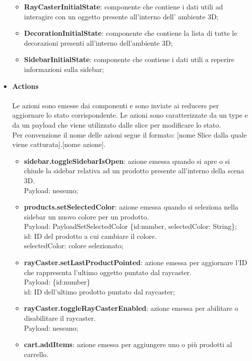 \begin{itemize}
\begin{itemize}
			\item \textbf{RayCasterInitialState}: componente che contiene i dati utili ad interagire con un oggetto presente all'interno dell'
			ambiente 3D;
			\item \textbf{DecorationInitialState}: componente che contiene la lista di tutte le decorazioni presenti all'interno dell'ambiente 3D;
			\item \textbf{SidebarInitialState}: componente che contiene i dati utili a reperire informazioni sulla sidebar;
		\end{itemize}
		\item \textbf{\large Actions}
		\\\\
		Le azioni sono emesse dai componenti e sono inviate ai reducers per aggiornare lo stato corrispondente.
		Le azioni sono caratterizzate da un type e da un payload che viene utilizzato dalle slice per modificare lo stato.
		\\
		Per convenzione il nome delle azioni segue il formato: [nome Slice dalla quale viene catturata].[nome azione].
		\begin{itemize}
			\item \textbf{sidebar.toggleSidebarIsOpen}: azione emessa quando si apre o si chiude la sidebar relativa ad un prodotto presente 
			all'interno della scena 3D.
			\\
			Payload: nessuno;
			\item \textbf{products.setSelectedColor}: azione emessa quando si seleziona nella sidebar un nuovo colore per un prodotto.
			\\
			Payload: PayloadSetSelectedColor \{id:number, selectedColor: String\};
			\\
			id: ID del prodotto a cui cambiare il colore.
			\\
			selectedColor: colore selezionato;
			\item \textbf{rayCaster.setLastProductPointed}: azione emessa per aggiornare l'ID che rappresenta l'ultimo oggetto puntato dal raycaster.
			\\
			Payload: \{id:number\}
			\\
			id: ID dell'ultimo prodotto puntato dal raycaster;
			\item \textbf{rayCaster.toggleRayCasterEnabled}: azione emessa per abilitare o disabilitare il raycaster.
			\\
			Payload: nessuno;
			\item \textbf{cart.addItems}: azione emessa per aggiungere uno o più prodotti al carrello.

\end{itemize}
\end{itemize}
